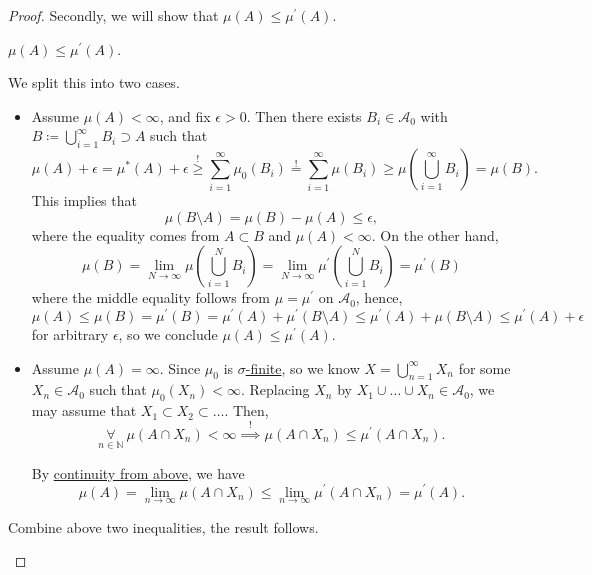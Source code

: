 \begin{proof}
	Secondly, we will show that \(\mu (A)\leq \mu ^\prime (A)\).
	\begin{claim}
		\(\mu (A)\leq \mu ^\prime (A)\).
	\end{claim}
	\begin{explanation}
		We split this into two cases.
		\begin{itemize}
			\item \label{pf:uniqueness-of-HK-extension-2.i}Assume \(\mu (A)<\infty \), and fix \(\epsilon >0\). Then there exists \(B_{i}\in\mathcal{A} _0\) with \(B\coloneqq \bigcup_{i=1}^{\infty} B_{i}\supset A\)
			      such that
			      \[
				      \mu (A)+\epsilon = \mu ^{\ast} (A) + \epsilon\overset{\hyperref[prop:outer-measure]{!}}{\geq} \sum_{i=1}^{\infty} \mu _0(B_{i}) \overset{\hyperref[def:pre-measure-countable-additivity-within-the-algebra]{!}}{=} \sum_{i=1}^{\infty} \mu (B_{i})\geq \mu \left(\bigcup_{i=1}^{\infty} B_{i}\right) = \mu (B).
			      \]
			      This implies that
			      \[
				      \mu (B\setminus A) = \mu (B) - \mu (A)\leq \epsilon,
			      \]
			      where the equality comes from \(A\subset B\) and \(\mu (A)<\infty \). On the other hand,
			      \[
				      \mu (B) = \lim_{N \to \infty} \mu \left(\bigcup_{i=1}^{N} B_{i}\right) = \lim_{N \to \infty} \mu ^\prime \left(\bigcup_{i=1}^{N} B_{i}\right) = \mu ^\prime (B)
			      \]
			      where the middle equality follows from \(\mu  = \mu ^\prime \) on \(\mathcal{A} _0\), hence,
			      \[
				      \mu (A)\leq \mu (B) = \mu ^\prime (B) = \mu ^\prime (A)+\mu ^\prime (B\setminus A) \leq \mu ^\prime (A) + \mu (B\setminus A) \leq \mu ^\prime (A) + \epsilon
			      \]
			      for arbitrary \(\epsilon \), so we conclude \(\mu (A)\leq \mu ^\prime (A)\).
			\item Assume \(\mu (A) = \infty \). Since \(\mu _0\) is \hyperref[def:finite-measure]{\(\sigma \)-finite}, so we know \(X = \bigcup_{n=1}^{\infty} X_{n}\) for some \(X_{n}\in\mathcal{A} _0\) such that
			      \(\mu _0(X_{n})<\infty\).  Replacing \(X_{n}\) by \(X_{1}\cup \dots \cup X_{n} \in\mathcal{A} _0\), we may assume that \(X_1 \subset X_2 \subset \dots\).
			      Then,
			      \[
				      \underset{n\in\mathbb{N} }{\forall}\ \mu (A \cap X_{n})<\infty\overset{\hyperref[pf:uniqueness-of-HK-extension-2.i]{!}}{\implies} \mu (A\cap X_{n})\leq \mu ^\prime (A\cap X_{n}).
			      \]

			      By \hyperref[thm:measure-space-continuity-from-above]{continuity from above}, we have
			      \[
				      \mu (A) = \lim_{n \to \infty} \mu (A\cap X_{n})\leq \lim_{n \to \infty} \mu ^\prime (A\cap X_{n}) = \mu ^\prime (A).
			      \]
		\end{itemize}
		Combine above two inequalities, the result follows.
	\end{explanation}
\end{proof}

